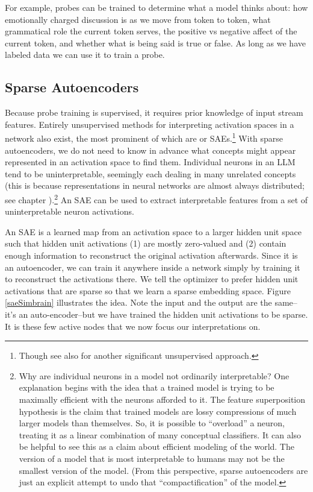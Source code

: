 For example, probes can be trained to determine what a model thinks about: how
emotionally charged discussion is as we move from token to token, what
grammatical role the current token serves, the positive vs negative affect of
the current token, and whether what is being said is true or false. As long as
we have labeled data we can use it to train a probe.

\subsection{Sparse Autoencoders}

Because probe training is supervised, it requires prior knowledge of input
stream features. Entirely unsupervised methods for interpreting activation
spaces in a network also exist, the most prominent of which are
 or SAEs.\footnote{Though see also
\cite{burns2024discovering} for another significant unsupervised approach.}
With sparse autoencoders, we do not need to know in advance what concepts might
appear represented in an activation space to find them. Individual neurons in
an LLM tend to be uninterpretable, seemingly each dealing in many unrelated
concepts \cite{elhage2022superposition, scherlis2025polysemanticity} (this is
because representations in neural networks are almost always distributed; see
chapter ).\footnote{Why are individual neurons in a model not
ordinarily interpretable? One explanation begins with the idea that a trained
model is trying to be maximally efficient with the neurons afforded to it. The
feature superposition hypothesis is the claim that trained models are lossy
compressions of much larger models than themselves. So, it is possible to
``overload'' a neuron, treating it as a linear combination of many conceptual
classifiers. It can also be helpful to see this as a claim about efficient
modeling of the world. The version of a model that is most interpretable to
humans may not be the smallest version of the model. (From this perspective,
sparse autoencoders are just an explicit attempt to undo that
``compactification'' of the model.} An SAE can be used to extract
interpretable features from a set of uninterpretable neuron activations.

An SAE is a learned map from an activation space to a larger hidden unit space
such that hidden unit activations (1) are mostly zero-valued and (2) contain
enough information to reconstruct the original activation afterwards. Since it
is an autoencoder, we can train it anywhere inside a network simply by training
it to reconstruct the activations there. We tell the optimizer to prefer hidden
unit activations that are sparse so that we learn a sparse embedding space.
Figure \ref{saeSimbrain} illustrates the idea. Note the input and the output
are the same--it's an auto-encoder--but we have trained the hidden unit
activations to be sparse. It is these few active nodes that we now focus our
interpretations on.

